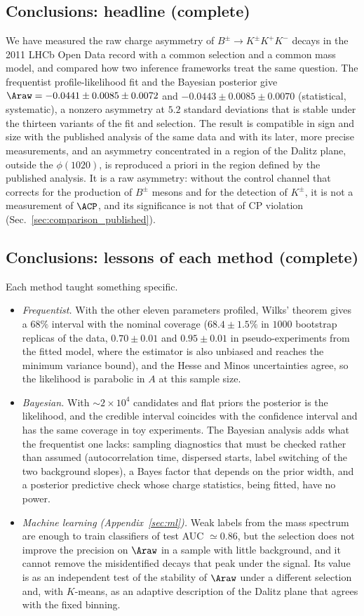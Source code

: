 \subsection{Conclusions: headline (complete)}
We have measured the raw charge asymmetry of $B^\pm\to K^\pm K^+K^-$ decays in the 2011 LHCb Open Data record with a common selection and a common mass model, and compared how two inference frameworks treat the same question. The frequentist profile-likelihood fit and the Bayesian posterior give $\Araw=-0.0441\pm0.0085\pm0.0072$ and $-0.0443\pm0.0085\pm0.0070$ (statistical, systematic), a nonzero asymmetry at $5.2$ standard deviations that is stable under the thirteen variants of the fit and selection. The result is compatible in sign and size with the published analysis of the same data and with its later, more precise measurements, and an asymmetry concentrated in a region of the Dalitz plane, outside the $\phi(1020)$, is reproduced a priori in the region defined by the published analysis. It is a raw asymmetry: without the control channel that corrects for the production of $B^\pm$ mesons and for the detection of $K^\pm$, it is not a measurement of $\ACP$, and its significance is not that of CP violation (Sec.~\ref{sec:comparison_published}).

\subsection{Conclusions: lessons of each method (complete)}
Each method taught something specific.
\begin{itemize}[leftmargin=*,itemsep=2pt]
\item \emph{Frequentist.} With the other eleven parameters profiled, Wilks' theorem gives a $68\%$ interval with the nominal coverage ($68.4\pm1.5\%$ in $1000$ bootstrap replicas of the data, $0.70\pm0.01$ and $0.95\pm0.01$ in pseudo-experiments from the fitted model, where the estimator is also unbiased and reaches the minimum variance bound), and the Hesse and Minos uncertainties agree, so the likelihood is parabolic in $A$ at this sample size.
\item \emph{Bayesian.} With $\sim2\times10^4$ candidates and flat priors the posterior is the likelihood, and the credible interval coincides with the confidence interval and has the same coverage in toy experiments. The Bayesian analysis adds what the frequentist one lacks: sampling diagnostics that must be checked rather than assumed (autocorrelation time, dispersed starts, label switching of the two background slopes), a Bayes factor that depends on the prior width, and a posterior predictive check whose charge statistics, being fitted, have no power.
\item \emph{Machine learning (Appendix~\ref{sec:ml}).} Weak labels from the mass spectrum are enough to train classifiers of test AUC $\simeq0.86$, but the selection does not improve the precision on $\Araw$ in a sample with little background, and it cannot remove the misidentified decays that peak under the signal. Its value is as an independent test of the stability of $\Araw$ under a different selection and, with $K$-means, as an adaptive description of the Dalitz plane that agrees with the fixed binning.
\end{itemize}

